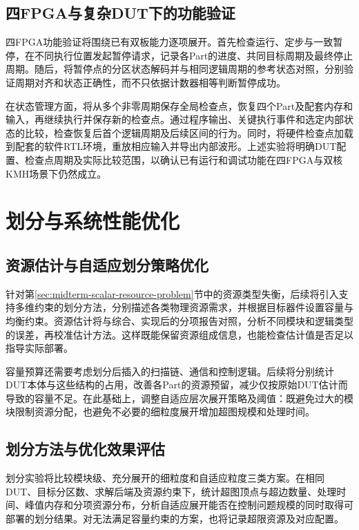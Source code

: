 \subsection{四FPGA与复杂DUT下的功能验证}

四FPGA功能验证将围绕已有双板能力逐项展开。首先检查运行、定步与一致暂停，在不同执行位置发起暂停请求，记录各Part的进度、共同目标周期及最终停止周期。随后，将暂停点的分区状态解码并与相同逻辑周期的参考状态对照，分别验证周期对齐和状态正确性，而不只依据计数器相等判断暂停成功。

在状态管理方面，将从多个非零周期保存全局检查点，恢复四个Part及配套内存和输入，再继续执行并保存新的检查点。通过程序输出、关键执行事件和选定内部状态的比较，检查恢复后首个逻辑周期及后续区间的行为。同时，将硬件检查点加载到配套的软件RTL环境，重放相应输入并导出内部波形。上述实验将明确DUT配置、检查点周期及实际比较范围，以确认已有运行和调试功能在四FPGA与双核KMH场景下仍然成立。

\section{划分与系统性能优化}
\label{sec:midterm-plan-optimization}

\subsection{资源估计与自适应划分策略优化}

针对第\ref{sec:midterm-scalar-resource-problem}节中的资源类型失衡，后续将引入支持多维约束的划分方法，分别描述各类物理资源需求，并根据目标器件设置容量与均衡约束。资源估计将与综合、实现后的分项报告对照，分析不同模块和逻辑类型的误差，再校准估计方法。这样既能保留资源组成信息，也能检查估计值是否足以指导实际部署。

容量预算还需要考虑划分后插入的扫描链、通信和控制逻辑。后续将分别统计DUT本体与这些结构的占用，改善各Part的资源预留，减少仅按原始DUT估计而导致的容量不足。在此基础上，调整自适应层次展开策略及阈值：既避免过大的模块限制资源分配，也避免不必要的细粒度展开增加超图规模和处理时间。

\subsection{划分方法与优化效果评估}

划分实验将比较模块级、充分展开的细粒度和自适应粒度三类方案。在相同DUT、目标分区数、求解后端及资源约束下，统计超图顶点与超边数量、处理时间、峰值内存和分项资源分布，分析自适应展开能否在控制问题规模的同时取得可部署的划分结果。对无法满足容量约束的方案，也将记录超限资源及对应配置。

